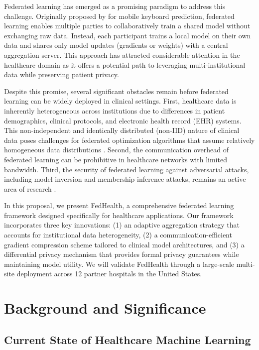 \documentclass[12pt,letterpaper]{article}
\begin{document}
Federated learning has emerged as a promising paradigm to address this challenge. Originally proposed by \citet{McMahan2017} for mobile keyboard prediction, federated learning enables multiple parties to collaboratively train a shared model without exchanging raw data. Instead, each participant trains a local model on their own data and shares only model updates (gradients or weights) with a central aggregation server. This approach has attracted considerable attention in the healthcare domain \citep{Rieke2020, Sheller2020} as it offers a potential path to leveraging multi-institutional data while preserving patient privacy.

Despite this promise, several significant obstacles remain before federated learning can be widely deployed in clinical settings. First, healthcare data is inherently heterogeneous across institutions due to differences in patient demographics, clinical protocols, and electronic health record (EHR) systems. This non-independent and identically distributed (non-IID) nature of clinical data poses challenges for federated optimization algorithms that assume relatively homogeneous data distributions \citep{Li2020}. Second, the communication overhead of federated learning can be prohibitive in healthcare networks with limited bandwidth. Third, the security of federated learning against adversarial attacks, including model inversion and membership inference attacks, remains an active area of research \citep{Nasr2019}.

In this proposal, we present FedHealth, a comprehensive federated learning framework designed specifically for healthcare applications. Our framework incorporates three key innovations: (1) an adaptive aggregation strategy that accounts for institutional data heterogeneity, (2) a communication-efficient gradient compression scheme tailored to clinical model architectures, and (3) a differential privacy mechanism that provides formal privacy guarantees while maintaining model utility. We will validate FedHealth through a large-scale multi-site deployment across 12 partner hospitals in the United States.

\section{Background and Significance}
\label{sec:background}

\subsection{Current State of Healthcare Machine Learning}
\end{document}
